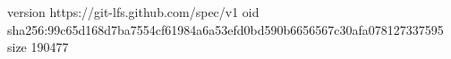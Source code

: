 version https://git-lfs.github.com/spec/v1
oid sha256:99c65d168d7ba7554cf61984a6a53efd0bd590b6656567c30afa078127337595
size 190477
